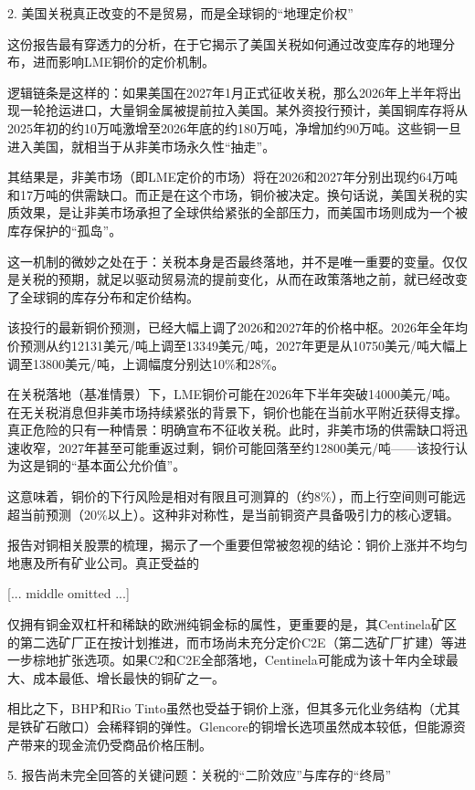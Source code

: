 \documentclass[11pt]{ctexart}
\begin{document}
2. 美国关税真正改变的不是贸易，而是全球铜的“地理定价权”

这份报告最有穿透力的分析，在于它揭示了美国关税如何通过改变库存的地理分布，进而影响LME铜价的定价机制。

逻辑链条是这样的：如果美国在2027年1月正式征收关税，那么2026年上半年将出现一轮抢运进口，大量铜金属被提前拉入美国。某外资投行预计，美国铜库存将从2025年初的约10万吨激增至2026年底的约180万吨，净增加约90万吨。这些铜一旦进入美国，就相当于从非美市场永久性“抽走”。

其结果是，非美市场（即LME定价的市场）将在2026和2027年分别出现约64万吨和17万吨的供需缺口。而正是在这个市场，铜价被决定。换句话说，美国关税的实质效果，是让非美市场承担了全球供给紧张的全部压力，而美国市场则成为一个被库存保护的“孤岛”。

这一机制的微妙之处在于：关税本身是否最终落地，并不是唯一重要的变量。仅仅是关税的预期，就足以驱动贸易流的提前变化，从而在政策落地之前，就已经改变了全球铜的库存分布和定价结构。

该投行的最新铜价预测，已经大幅上调了2026和2027年的价格中枢。2026年全年均价预测从约12131美元/吨上调至13349美元/吨，2027年更是从10750美元/吨大幅上调至13800美元/吨，上调幅度分别达10\%和28\%。

在关税落地（基准情景）下，LME铜价可能在2026年下半年突破14000美元/吨。在无关税消息但非美市场持续紧张的背景下，铜价也能在当前水平附近获得支撑。真正危险的只有一种情景：明确宣布不征收关税。此时，非美市场的供需缺口将迅速收窄，2027年甚至可能重返过剩，铜价可能回落至约12800美元/吨——该投行认为这是铜的“基本面公允价值”。

这意味着，铜价的下行风险是相对有限且可测算的（约8\%），而上行空间则可能远超当前预测（20\%以上）。这种非对称性，是当前铜资产具备吸引力的核心逻辑。

报告对铜相关股票的梳理，揭示了一个重要但常被忽视的结论：铜价上涨并不均匀地惠及所有矿业公司。真正受益的

[... middle omitted ...]

仅拥有铜金双杠杆和稀缺的欧洲纯铜金标的属性，更重要的是，其Centinela矿区的第二选矿厂正在按计划推进，而市场尚未充分定价C2E（第二选矿厂扩建）等进一步棕地扩张选项。如果C2和C2E全部落地，Centinela可能成为该十年内全球最大、成本最低、增长最快的铜矿之一。

相比之下，BHP和Rio Tinto虽然也受益于铜价上涨，但其多元化业务结构（尤其是铁矿石敞口）会稀释铜的弹性。Glencore的铜增长选项虽然成本较低，但能源资产带来的现金流仍受商品价格压制。

5. 报告尚未完全回答的关键问题：关税的“二阶效应”与库存的“终局”
\end{document}
